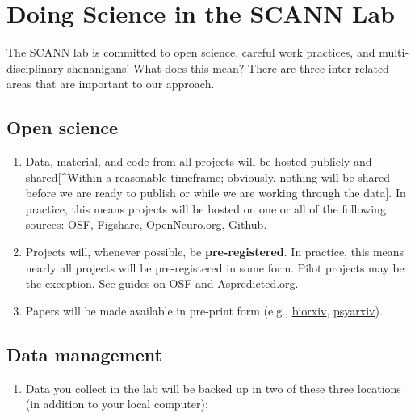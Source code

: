 \documentclass[
  12pt,
]{book}
\providecommand{\tightlist}{%
  \setlength{\itemsep}{0pt}\setlength{\parskip}{0pt}}
\begin{document}
\hypertarget{doing-science-in-the-scann-lab}{%
\chapter{Doing Science in the SCANN Lab}\label{doing-science-in-the-scann-lab}}

The SCANN lab is committed to open science, careful work practices, and multi-disciplinary shenanigans! What does this mean? There are three inter-related areas that are important to our approach.

\hypertarget{open-science}{%
\section{Open science}\label{open-science}}

\begin{enumerate}
\def\labelenumi{\arabic{enumi}.}
\item
  Data, material, and code from all projects will be hosted publicly and shared{[}\^{}Within a reasonable timeframe; obviously, nothing will be shared before we are ready to publish or while we are working through the data{]}. In practice, this means projects will be hosted on one or all of the following sources: \href{osf.io}{OSF}, \href{figshare.com}{Figshare}, \url{OpenNeuro.org}, \href{github.com}{Github}.
\item
  Projects will, whenever possible, be \textbf{pre-registered}. In practice, this means nearly all projects will be pre-registered in some form. Pilot projects may be the exception. See guides on \href{https://osf.io/prereg/}{OSF} and \href{aspredicted.org}{Aspredicted.org}.
\item
  Papers will be made available in pre-print form (e.g., \href{biorxiv.org}{biorxiv}, \href{https://psyarxiv.com/}{psyarxiv}).
\end{enumerate}

\hypertarget{data-management}{%
\section{Data management}\label{data-management}}

\begin{enumerate}
\def\labelenumi{\arabic{enumi}.}
\tightlist
\item
  Data you collect in the lab will be backed up in two of these three locations (in addition to your local computer):
\end{enumerate}
\end{document}
